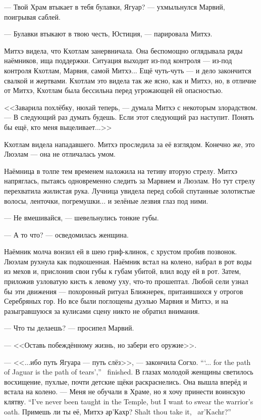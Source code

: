 --- Твой Храм втыкает в тебя булавки, Ягуар? --- ухмыльнулся Марвий, поигрывая саблей.

--- Булавки втыкают в твою честь, Юстиция, --- парировала Митхэ.

Митхэ видела, что Кхотлам занервничала.
Она беспомощно оглядывала ряды наёмников, ища поддержки.
Ситуация выходит из-под контроля --- из-под контроля Кхотлам, Марвия, самой Митхэ...
Ещё чуть-чуть --- и дело закончится свалкой и жертвами.
Кхотлам это видела так же ясно, как и Митхэ, но, в отличие от Митхэ, Кхотлам была бессильна перед угрожающей ей опасностью.

<<Заварила похлёбку, нюхай теперь, --- думала Митхэ с некоторым злорадством.
--- В следующий раз думать будешь.
Если этот следующий раз наступит.
Понять бы ещё, кто меня выцеливает...>>

Кхотлам видела нападавшего.
Митхэ проследила за её взглядом.
Конечно же, это Люэлам --- она не отличалась умом.

Наёмница в толпе тем временем наложила на тетиву вторую стрелу.
Митхэ напряглась, пытаясь одновременно следить за Марвием и Люэлам.
Но тут стрелу перехватила жилистая рука.
Лучница увидела перед собой спутанные золотистые волосы, ленточки, погремушки... и зелёные лезвия глаз под ними.

--- Не вмешивайся, --- шевельнулись тонкие губы.

--- А то что? --- осведомилась женщина.

Наёмник молча вонзил ей в шею гриф-клинок, с хрустом пробив позвонок.
Люэлам рухнула как подкошенная.
Наёмник встал на колено, набрал в рот воды из мехов и, прислонив свои губы к губам убитой, влил воду ей в рот.
Затем, приложив узловатую кисть к левому уху, что-то прошептал.
Любой сели узнал бы эти движения --- похоронный ритуал Ближнерек, притаившихся у отрогов Серебряных гор.
Но все были поглощены дуэлью Марвия и Митхэ, и на разыгравшуюся за кулисами сцену никто не обратил внимания.

\asterism

--- Что ты делаешь? --- просипел Марвий.

--- <<Оставь побеждённому жизнь, но забери его оружие>>.

{--- <<...ибо путь Ягуара --- путь слёз>>, --- закончила Согхо.}
{```... for the path of Jaguar is the path of tears','' \Sogcho\ finished.}
В глазах молодой женщины светилось восхищение, пухлые, почти детские щёки раскраснелись.
Она вышла вперёд и встала на колено.
{--- Меня не обучали в Храме, но я хочу принести воинскую клятву.}
{``I've never been taught in the Temple, but I want to swear the warrior's oath.}
{Примешь ли ты её, Митхэ ар'Кахр?}
{Shalt thou take it, \Mitchoe\ ar'Kachr?''}

